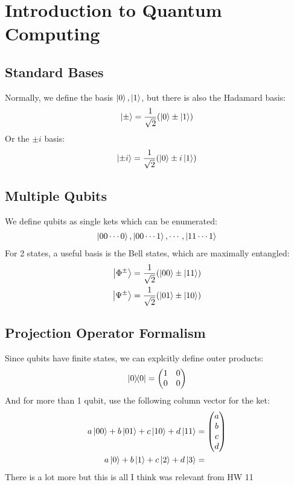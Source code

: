 \section{Introduction to Quantum Computing}
\subsection{Standard Bases}
Normally, we define the basis ${\ket{0},\ket{1}}$, but there is also the Hadamard basis:
\begin{align*}
  \ket{\pm}=\frac{1}{\sqrt{2}}\qty(\ket{0}\pm\ket{1})
\end{align*}
Or the $\pm{i}$ basis:
\begin{align*}
  \ket{\pm i}=\frac{1}{\sqrt{2}}\qty(\ket{0}\pm i\ket{1})
\end{align*}
\subsection{Multiple Qubits}
We define qubits as single kets which can be enumerated:
\begin{align*}
  \ket{00\cdots0},\ket{00\cdots1},\cdots,\ket{11\cdots1}
\end{align*}
For 2 states, a useful basis is the Bell states, which are maximally entangled:
\begin{align*}
  \ket{\Phi^\pm}&=\frac{1}{\sqrt{2}}\qty(\ket{00}\pm\ket{11})\\
  \ket{\Psi^\pm}&=\frac{1}{\sqrt{2}}\qty(\ket{01}\pm\ket{10})\\
\end{align*}
\subsection{Projection Operator Formalism}
Since qubits have finite states, we can explcitly define outer products:
\begin{align*}
  \dyad{0}=\pmqty{1&0\\0&0}
\end{align*}
And for more than 1 qubit, use the following column vector for the ket:
\begin{align*}
  a\ket{00}+b\ket{01}+c\ket{10}+d\ket{11}&=\pmqty{a\\b\\c\\d}\\
  a\ket{0}+b\ket{1}+c\ket{2}+d\ket{3}&=
\end{align*}
There is a lot more but this is all I think was relevant from HW 11